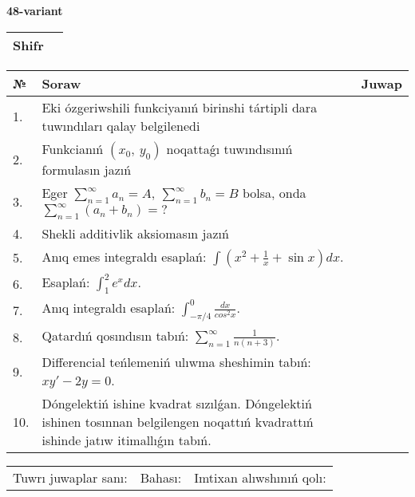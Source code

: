 \documentclass{article}
\begin{document}
  \egroup
  
  \newpage
  
  
  \textbf{48-variant}\\
  
  \bgroup
  \def\arraystretch{1.6} %
  
  \begin{tabular}{|m{5.7cm}|m{9.5cm}|}
  \hline
  Shifr & \\
  \hline
  \end{tabular}
  
  \vspace{1cm}
  
  \begin{tabular}{|m{0.7cm}|m{10cm}|m{4cm}|}
  \hline
  № & Soraw & Juwap \\
  \hline
  1. & Eki ózgeriwshili funkciyanıń birinshi tártipli dara tuwındıları qalay belgilenedi &  \\
  \hline
  2. & Funkcianıń \((x_{0},\ y_{0})\) noqattaǵı tuwındısınıń formulasın jazıń &  \\
  \hline
  3. & Eger \(\sum_{n = 1}^{\infty}a_{n} = A,\ \sum_{n = 1}^{\infty}b_{n} = B\) bolsa, onda \(\sum_{n = 1}^{\infty}\left( a_{n} + b_{n} \right) = ?\) &  \\
  \hline
  4. & Shekli additivlik aksiomasın jazıń &  \\
  \hline
  5. & Anıq emes integraldı esaplań: \(\int{\left( x^2  + \frac{1}{x} + \sin x \right)dx}\). &  \\
  \hline
  6. & Esaplań: \(\int_{1}^2 {e^{x}dx}\). &  \\
  \hline
  7. & Anıq integraldı esaplań: \(\int_{- \pi/4}^{0}\frac{dx}{cos^2 x}\). &  \\
  \hline
  8. & Qatardıń qosındısın tabıń: \(\sum_{n = 1}^{\infty}\frac{1}{n(n + 3)}\). &  \\
  \hline
  9. & Differencial teńlemeniń ulıwma sheshimin tabıń: \(xy' - 2y = 0\). &  \\
  \hline
  10. & Dóngelektiń ishine kvadrat sızılǵan. Dóngelektiń ishinen tosınnan belgilengen noqattıń kvadrattıń ishinde jatıw itimallıǵın tabıń. &  \\
  \hline
  \end{tabular}
  
  \vspace{1cm}
  
  \begin{tabular}{lll}
  Tuwrı juwaplar sanı: \underline{\hspace{1.5cm}} & 
  Bahası: \underline{\hspace{1.5cm}} & 
  Imtixan alıwshınıń qolı: \underline{\hspace{2cm}} \\
  \end{tabular}
  
\end{document}
